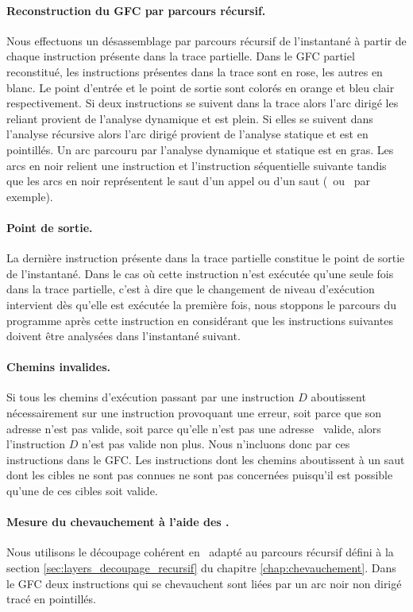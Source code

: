 \paragraph{Reconstruction du GFC par parcours récursif.}
Nous effectuons un désassemblage par parcours récursif de l'instantané à partir de chaque instruction présente dans la trace partielle.
Dans le GFC partiel reconstitué, les instructions présentes dans la trace sont en rose, les autres en blanc. Le point d'entrée et le point de sortie sont colorés en orange et bleu clair respectivement.
Si deux instructions se suivent dans la trace alors l'arc dirigé les reliant provient de l'analyse dynamique et est plein. Si elles se suivent dans l'analyse récursive alors l'arc dirigé provient de l'analyse statique et est en pointillés. Un arc parcouru par l'analyse dynamique et statique est en gras. Les arcs en noir relient une instruction et l'instruction séquentielle suivante tandis que les arcs en noir représentent le saut d'un appel ou d'un saut (\call\ ou \jmp\ par exemple).

\paragraph{Point de sortie.}
La dernière instruction présente dans la trace partielle constitue le point de sortie de l'instantané.
Dans le cas où cette instruction n'est exécutée qu'une seule fois dans la trace partielle, c'est à dire que le changement de niveau d'exécution intervient dès qu'elle est exécutée la première fois, nous stoppons le parcours du programme après cette instruction en considérant que les instructions suivantes doivent être analysées dans l'instantané suivant.

\paragraph{Chemins invalides.}
Si tous les chemins d'exécution passant par une instruction $D$ aboutissent nécessairement sur une instruction provoquant une erreur, soit parce que son adresse n'est pas valide, soit parce qu'elle n'est pas une adresse \xq\ valide, alors l'instruction $D$ n'est pas valide non plus.
Nous n'incluons donc par ces instructions dans le GFC.
Les instructions dont les chemins aboutissent à un saut dont les cibles ne sont pas connues ne sont pas concernées puisqu'il est possible qu'une de ces cibles soit valide.


\paragraph{Mesure du chevauchement à l'aide des \layers.}
Nous utilisons le découpage cohérent en \layers\ adapté au parcours récursif défini à la section \ref{sec:layers_decoupage_recursif} du chapitre \ref{chap:chevauchement}.
Dans le GFC deux instructions qui se chevauchent sont liées par un arc noir non dirigé tracé en pointillés.


